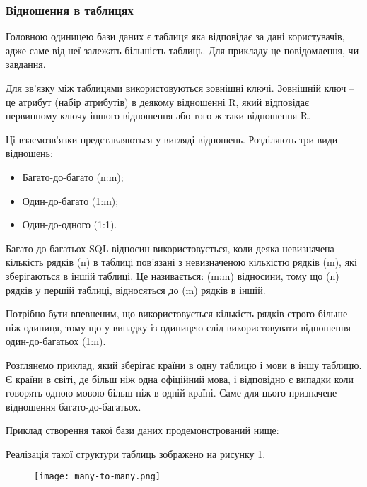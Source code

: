 \subsubsection{Відношення в таблицях}
\par Головною одиницею бази даних є таблиця яка відповідає за дані користувачів, адже саме від неї залежать більшість таблиць. Для прикладу це повідомлення, чи завдання.
\par Для зв'язку між таблицями використовуються зовнішні ключі. Зовнішній ключ -- це атрибут (набір атрибутів) в деякому відношенні R, який відповідає первинному ключу іншого відношення або того ж таки відношення R.
\par Ці взаємозв'язки представляються у вигляді відношень. Розділяють три види відношень:
\begin{itemize}
	\item Багато-до-багато (n:m);
	\item Один-до-багато (1:m);
	\item Один-до-одного (1:1).
\end{itemize}
\par Багато-до-багатьох SQL відносин використовується, коли деяка невизначена кількість рядків (n) в таблиці пов'язані з невизначеною кількістю рядків (m), які зберігаються в іншій таблиці. Це називається: (m:m) відносини, тому що (n) рядків у першій таблиці, відносяться до (m) рядків в іншій.
\par Потрібно бути впевненим, що використовується кількість рядків строго більше ніж одиниця, тому що у випадку із одиницею слід використовувати відношення один-до-багатьох (1:n).
\par Розглянемо приклад, який зберігає країни в одну таблицю і мови в іншу таблицю. Є країни в світі, де більш ніж одна офіційний мова, і відповідно є випадки коли говорять одною мовою більш ніж в одній країні. Саме для цього призначене відношення багато-до-багатьох. 
\par Приклад створення такої бази даних продемонстрований нище:


\par Реалізація такої структури таблиць зображено на рисунку \ref{pic:many_to_many.png}.
\begin{figure}[!ht]
\centering
		\texttt{[image: many-to-many.png]}
		\vspace{18pt}
		\label{pic:many_to_many.png}
\end{figure}

